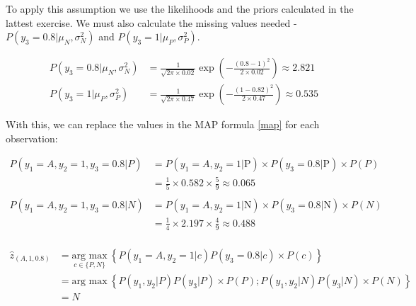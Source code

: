 \documentclass[12pt]{article}
\begin{document}
\begin{enumerate}[leftmargin=\labelsep]
    \vspace{10pt}
    To apply this assumption we use the likelihoods and the priors calculated in the lattest exercise.
    We must also calculate the missing values needed - $P(y_3 = 0.8|\mu_N, \sigma_N^2)$ and $P(y_3 = 1|\mu_P, \sigma_P^2)$.

    \begin{equation*}
        \begin{aligned}
            P(y_3 = 0.8|\mu_N, \sigma_N^2) &= \frac{1}{\sqrt{2\pi \times 0.02}} \exp\left(-\frac{(0.8 - 1)^2}{2 \times 0.02}\right) \approx 2.821\\
            P(y_3 = 1|\mu_P, \sigma_P^2) &= \frac{1}{\sqrt{2\pi \times 0.47}} \exp\left(-\frac{(1 - 0.82)^2}{2 \times 0.47}\right) \approx 0.535
        \end{aligned}
    \end{equation*}

    \vspace{10pt}
    With this, we can replace the values in the MAP formula \eqref{map} for each observation:

    \vspace{10pt}
    \begin{equation*}
        \begin{aligned}
        P(y_1 = A, y_2 = 1, y_3 = 0.8 | P) &= P(y_1 = A, y_2 = 1 | \text{P}) \times P(y_3 = 0.8 | \text{P}) \times P(P) \\
        &= \frac{1}{5} \times 0.582 \times \frac{5}{9} \approx 0.065\\
        \\
        P(y_1 = A, y_2 = 1, y_3 = 0.8 | N) &= P(y_1 = A, y_2 = 1 | \text{N}) \times P(y_3 = 0.8 | \text{N}) \times P(N) \\
        &= \frac{1}{4} \times 2.197 \times \frac{4}{9} \approx 0.488\\
        \end{aligned}
    \end{equation*}

    \begin{equation*}
    \begin{aligned}
        \hat{z}_{(A, 1, 0.8)} &= \underset{c \in \{P,N\}}{\text{arg max}} \medspace \left\{P(y_1 = A, y_2 = 1 | c) P(y_3 = 0.8| c) \times P(c)\right\}\\
                    & = \text{arg max} \medspace \left\{P(y_1, y_2 | P) P(y_3| P) \times P(P); P(y_1, y_2 | N) P(y_3| N) \times P(N)\right\} \\
                    & = N
    \end{aligned}
    \end{equation*}


\end{enumerate}
\end{document}
